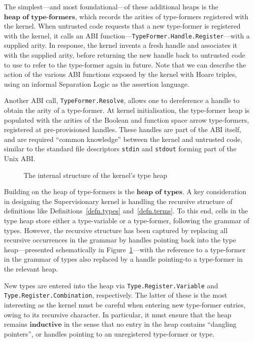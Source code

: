 \documentclass[a4paper, 10pt]{article}
\newcommand{\deffont}[1]{\ensuremath{\textbf{#1}}}
\begin{document}
The simplest---and most foundational---of these additional heaps is the \deffont{heap of type-formers}, which records the arities of type-formers registered with the kernel.
When untrusted code requests that a new type-former is registered with the kernel, it calls an ABI function---\texttt{TypeFormer.Handle.Register}---with a supplied arity.
In response, the kernel invents a fresh handle and associates it with the supplied arity, before returning the new handle back to untrusted code to use to refer to the type-former again in future.
Note that we can describe the action of the various ABI functions exposed by the kernel with Hoare triples, using an informal Separation Logic as the assertion language.

Another ABI call, \texttt{TypeFormer.Resolve}, allows one to dereference a handle to obtain the arity of a type-former.
At kernel initialisation, the type-former heap is populated with the arities of the Boolean and function space arrow type-formers, registered at pre-provisioned handles.
These handles are part of the ABI itself, and are required ``common knowledge'' between the kernel and untrusted code, similar to the standard file descriptors \texttt{stdin} and \texttt{stdout} forming part of the Unix ABI.

\begin{figure}[t]
\caption{The internal structure of the kernel's type heap}
\label{fig.type.heap}
\end{figure}

Building on the heap of type-formers is the \deffont{heap of types}.
A key consideration in designing the Supervisionary kernel is handling the recursive structure of definitions like Definitions~\ref{defn.types} and~\ref{defn.terms}.
To this end, cells in the type heap store either a type-variable or a type-former, following the grammar of types.
However, the recursive structure has been captured by replacing all recursive occurrences in the grammar by handles pointing back into the type heap---presented schematically in Figure~\ref{fig.type.heap}---with the reference to a type-former in the grammar of types also replaced by a handle pointing-to a type-former in the relevant heap.

New types are entered into the heap via \texttt{Type.Register.Variable} and \texttt{Type.Register.Combination}, respectively.
The latter of these is the most interesting as the kernel must be careful when entering new type-former entries, owing to its recursive character.
In particular, it must ensure that the heap remains \deffont{inductive} in the sense that no entry in the heap contains ``dangling pointers'', or handles pointing to an unregistered type-former or type.
\end{document}
